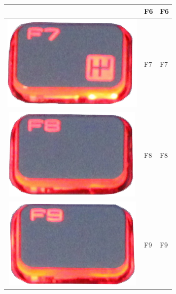 \begin{longtable}{|cll|}
\begin{minipage}[c]{.3\textwidth}
\vspace{0.2cm}
\end{minipage} & F6 & F6\\
\hline
\begin{minipage}[c]{.3\textwidth}
\vspace{0.2cm}
\includegraphics[scale=0.06]{Images/KeyMapping/F7}
\vspace{0.2cm}
\end{minipage} & F7 & F7\\
\hline
\begin{minipage}[c]{.3\textwidth}
\vspace{0.2cm}
\includegraphics[scale=0.06]{Images/KeyMapping/F8}
\vspace{0.2cm}
\end{minipage} & F8 & F8\\
\hline
\begin{minipage}[c]{.3\textwidth}
\vspace{0.2cm}
\includegraphics[scale=0.06]{Images/KeyMapping/F9}
\vspace{0.2cm}
\end{minipage} & F9 & F9\\

\end{longtable}

